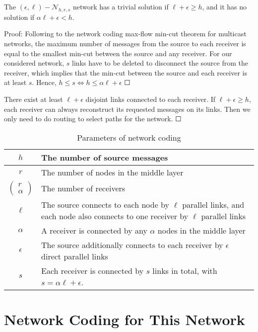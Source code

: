 \begin{thm}
\label{nw_parameters}The $(\epsilon,\ell)-\mathcal{N}_{h,r,s}$
network has a trivial solution if $\ell+\epsilon\geq h$, and it has
no solution if $\alpha\ell+\epsilon<h$.

Proof: Following to the network coding max-flow min-cut theorem for
multicast networks, the maximum number of messages from the source
to each receiver is equal to the smallest min-cut between the source
and any receiver. For our considered network, $s$ links have to be
deleted to disconnect the source from the receiver, which implies
that the min-cut between the source and each receiver is at least
$s$. Hence, $h\leq s\Leftrightarrow h\leq\alpha\ell+\epsilon$ $\Square$

There exist at least $\ell+\epsilon$ disjoint links connected to
each receiver. If $\ell+\epsilon\geq h$, each receiver can always
reconstruct its requested messages on its links. Then we only need
to do routing to select paths for the network. $\Square$
\end{thm}
\begin{table}[H]
\caption{Parameters of network coding \label{tab:Parameters-of-network}}

\centering{}%
\begin{tabular}{c|>{\centering}p{0.48\paperwidth}}
$h$ & The number of source messages\tabularnewline
\hline 
$r$ & The number of nodes in the middle layer\tabularnewline
\hline 
$\left(\begin{array}{c}
r\\
\alpha
\end{array}\right)$ & The number of receivers\tabularnewline
\hline 
$\ell$ & The source connects to each node by $\ell$ parallel links, and each
node also connects to one receiver by $\ell$ parallel links\tabularnewline
\hline 
$\alpha$ & A receiver is connected by any $\alpha$ nodes in the middle layer\tabularnewline
\hline 
$\epsilon$ & The source additionally connects to each receiver by $\epsilon$ direct
parallel links\tabularnewline
\hline 
$s$ & Each receiver is connected by $s$ links in total, with $s=\alpha\ell+\epsilon$.\tabularnewline
\end{tabular}
\end{table}


\section{Network Coding for This Network \label{sec:Network-Coding-for-GCN}}

